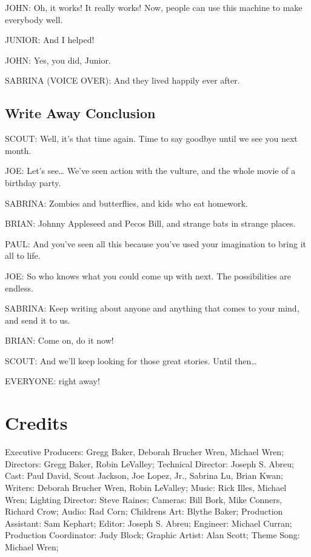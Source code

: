 JOHN:
Oh, it works!
It really works!
Now, people can use this machine to make everybody well.

JUNIOR:
And I helped!

JOHN:
Yes, you did, Junior.

SABRINA (VOICE OVER):
And they lived happily ever after.

\subsection{Write Away Conclusion}

SCOUT:
Well, it's that time again.
Time to say goodbye until we see you next month.

JOE:
Let's see\dots
We've seen action with the vulture, and the whole movie of a birthday party.

SABRINA:
Zombies and butterflies, and kids who eat homework.

BRIAN:
Johnny Appleseed and Pecos Bill, and strange bats in strange places.

PAUL:
And you've seen all this because you've used your imagination to bring it all to life.

JOE:
So who knows what you could come up with next.
The possibilities are endless.

SABRINA:
Keep writing about anyone and anything that comes to your mind, and send it to us.

BRIAN:
Come on, do it now!

SCOUT:
And we'll keep looking for those great stories.
Until then\dots

EVERYONE:
right away!

\section{Credits}

Executive Producers: Gregg Baker, Deborah Brucher Wren, Michael Wren;
Directors: Gregg Baker, Robin LeValley;
Technical Director: Joseph S. Abreu;
Cast: Paul David, Scout Jackson, Joe Lopez, Jr., Sabrina Lu, Brian Kwan;
Writers: Deborah Brucher Wren, Robin LeValley;
Music: Rick Illes, Michael Wren;
Lighting Director: Steve Raines;
Cameras: Bill Bork, Mike Conners, Richard Crow;
Audio: Rad Corn;
Childrens Art: Blythe Baker;
Production Assistant: Sam Kephart;
Editor: Joseph S. Abreu;
Engineer: Michael Curran;
Production Coordinator: Judy Block;
Graphic Artist: Alan Scott;
Theme Song: Michael Wren;

\clearpage
\newpage

